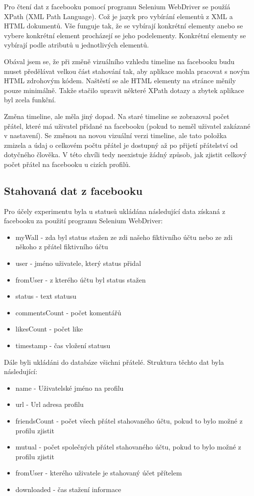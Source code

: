\documentclass[thesis=M,czech]{FITthesis}[2013/05/10]
\begin{document}
Pro čtení dat z facebooku pomocí programu Selenium WebDriver se použíá XPath (XML Path Language). Což je jazyk pro vybírání elementů z XML a HTML dokumentů. Vše funguje tak, že se vybírají konkrétní elementy anebo se vybere konkrétní element procházejí se jeho podelementy. Konkrétní elementy se vybírají podle atributů u jednotlivých elementů.

Obával jsem se, že při změně vizuálního vzhledu timeline na facebooku budu muset předělávat velkou část stahování tak, aby aplikace mohla pracovat s novým HTML zdrohovým kódem. Naštěstí se ale HTML elementy na stránce měnily pouze minimálně. Takže stačilo upravit některé XPath dotazy a zbytek aplikace byl zcela funkční.

Změna timeline, ale měla jiný dopad. Na staré timeline se zobrazoval počet přátel, které má uživatel přidané na facebooku (pokud to neměl uživatel zakázané v nastavení). Se změnou na novou vizuální verzi timeline, ale tato položka zmizela a údaj o celkovém počtu přátel je dostupný až po přijetí přátelství od dotyčného člověka. V této chvíli tedy neexistuje žádný způsob, jak zjistit celkový počet přátel na facebooku u cizích profilů. 

\subsection{Stahovaná dat z facebooku}

Pro účely experimentu byla u statusů ukládána následující data získaná z facebooku za použití programu Selenium WebDriver:

\begin{itemize}
  \item myWall - zda byl status stažen ze zdi našeho fiktivního účtu nebo ze zdi někoho z přátel fiktivního účtu
  \item user - jméno uživatele, který status přidal
  \item fromUser - z kterého účtu byl status stažen  
  \item status - text statusu
  \item commentsCount - počet komentářů
  \item likesCount - počet like
  \item timestamp - čas vložení statusu
\end{itemize}

Dále byli ukládáni do databáze všichni přátelé. Struktura těchto dat byla následující:

\begin{itemize}
  \item name - Uživatelské jméno na profilu
  \item url - Url adresa profilu
  \item friendsCount - počet všech přátel stahovaného účtu, pokud to bylo možné z profilu zjistit
  \item mutual - počet společných přátel stahovaného účtu, pokud to bylo možné z profilu zjistit
  \item fromUser - kterého uživatele je stahovaný účet přítelem
  \item downloaded - čas stažení informace
\end{itemize}
\end{document}
